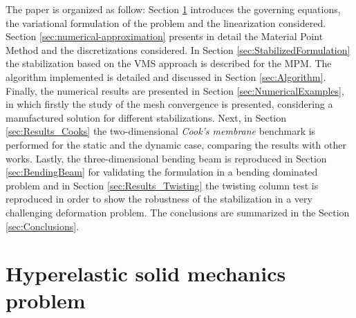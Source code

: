 \documentclass[11pt,english]{article}
\begin{document}
The paper is organized as follow:  Section \ref{sec:HyperelasticProblem} introduces the governing equations, the variational formulation of the problem and the linearization considered.  Section \ref{sec:numerical-approximation} presents in detail the Material Point Method and the discretizations considered. In Section \ref{sec:StabilizedFormulation} the stabilization based on the VMS approach is described for the MPM. The algorithm implemented is detailed and discussed in  Section \ref{sec:Algorithm}. Finally, the numerical results are presented in Section \ref{sec:NumericalExamples}, in which firstly the study of the mesh convergence is presented, considering a manufactured solution for different stabilizations. Next, in Section \ref{sec:Results_Cooks} the two-dimensional \textit{Cook's membrane} benchmark is performed for the static and the dynamic case, comparing the results with other works. Lastly, the three-dimensional bending beam is reproduced in Section \ref{sec:BendingBeam} for validating the formulation in a  bending dominated problem and in Section \ref{sec:Results_Twisting} the twisting column test is reproduced in order to show the robustness of the stabilization in a very challenging deformation problem. The conclusions are summarized in the Section \ref{sec:Conclusions}.

%
%

\section{Hyperelastic solid mechanics problem} \label{sec:HyperelasticProblem}

\end{document}
